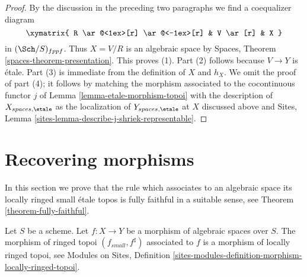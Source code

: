 \begin{proof}
\medskip\noindent
By the discussion in the preceding two paragraphs we find a
coequalizer diagram
$$
\xymatrix{
R \ar@<1ex>[r] \ar@<-1ex>[r] &
V \ar[r] &
X
}
$$
in $(\Sch/S)_{fppf}$. Thus $X = V/R$ is an algebraic space by
Spaces, Theorem \ref{spaces-theorem-presentation}. This proves (1).
Part (2) follows because $V \to Y$ is \'etale. Part (3) is immediate
from the definition of $X$ and $h_X$. We omit the proof of part (4);
it follows by matching the morphism associated to the cocontinuous
functor $j$ of Lemma \ref{lemma-etale-morphism-topoi}
with the description of $X_{spaces, \etale}$ as the localization
of $Y_{spaces, \etale}$ at $X$ discussed above and
Sites, Lemma \ref{sites-lemma-describe-j-shriek-representable}.
\end{proof}







\section{Recovering morphisms}
\label{section-morphisms}

\noindent
In this section we prove that the rule which associates to an algebraic space
its locally ringed small \'etale topos is fully faithful in a suitable
sense, see
Theorem \ref{theorem-fully-faithful}.

\begin{lemma}
\label{lemma-morphism-locally-ringed}
Let $S$ be a scheme.
Let $f : X \to Y$ be a morphism of algebraic spaces over $S$.
The morphism of ringed topoi $(f_{small}, f^\sharp)$
associated to $f$ is a morphism of locally ringed topoi, see
Modules on Sites,
Definition \ref{sites-modules-definition-morphism-locally-ringed-topoi}.
\end{lemma}

